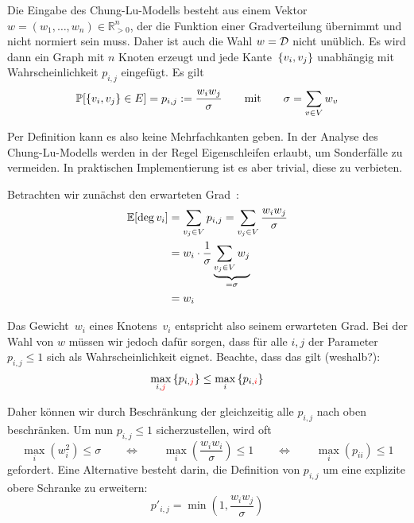 Die Eingabe des Chung-Lu-Modells besteht aus einem Vektor $w = (w_1, \ldots, w_n) \in \mathbb{R}_{>0}^n$, der die Funktion einer Gradverteilung übernimmt und nicht normiert sein muss.
Daher ist auch die Wahl $w = \mathcal{D}$ nicht unüblich.
Es wird dann ein Graph mit $n$ Knoten erzeugt und jede Kante~$\left\{v_i,v_j\right\}$ unabhängig mit Wahrscheinlichkeit $p_{i,j}$ eingefügt.
Es gilt
\begin{equation}
    \mathbb{P}\!\left[\left\{v_i,v_j\right\} \in E\right] = p_{i,j} := \frac{w_iw_j}{\sigma} \qquad \text{mit} \qquad \sigma = \sum_{v \in V} w_v
\end{equation}

Per Definition kann es also keine Mehrfachkanten geben.
In der Analyse des Chung-Lu-Modells werden in der Regel Eigenschleifen erlaubt, um Sonderfälle zu vermeiden.
In praktischen Implementierung ist es aber trivial, diese zu verbieten.

Betrachten wir zunächst den erwarteten Grad~:
\begin{align}
    \mathbb{E}\!\left[\deg{v_i}\right] & = \sum_{v_j \in V} p_{i,j} = \sum_{v_j \in V} \frac{w_iw_j}{\sigma}      \\
                     & =w_i \cdot \frac{1}{\sigma} \underbrace{\sum_{v_j \in V} w_j}_{= \sigma} \\
                     & = w_i
\end{align}

Das Gewicht~$w_i$ eines Knotens~$v_i$ entspricht also seinem erwarteten Grad.
Bei der Wahl von $w$ müssen wir jedoch dafür sorgen, dass für alle $i, j$ der Parameter~$p_{i,j} \le 1$ sich als Wahrscheinlichkeit eignet.
Beachte, dass das gilt (weshalb?):
\begin{equation}
    \max_{i,\textcolor{red}{j}} \left\{p_{i,\textcolor{red}{j}}\right\} \le \max_{i}\left\{p_{i,\textcolor{red}{i}}\right\}
\end{equation}

Daher können wir durch Beschränkung der  gleichzeitig alle $p_{i,j}$ nach oben beschränken.
Um nun $p_{i,j} \le 1$ sicherzustellen, wird oft
\begin{equation}
    \max_i\left(w_i^2\right) \le \sigma
    \qquad \Leftrightarrow \qquad \max_i\left(\frac{w_iw_i}{\sigma}\right) \le 1
    \qquad \Leftrightarrow \qquad \max_i\left(p_{ii}\right) \le 1
\end{equation}
gefordert.
Eine Alternative besteht darin, die Definition von $p_{i,j}$ um eine explizite obere Schranke zu erweitern:
\begin{equation}
    p'_{i,j} = \min\left(1, \frac{w_iw_j}{\sigma}\right)
\end{equation}

